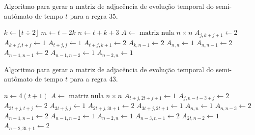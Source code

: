 \documentclass[12pt,a4paper]{article}
\begin{document}
\begin{algorithm}[H]
\caption{Algoritmo para gerar a matriz de adjacência de evolução temporal do
semi-autômato de tempo $t$ para a regra 35.}
\label{alg:r35}
\begin{algorithmic}
\STATE $k \leftarrow \lfloor t \div 2 \rfloor$
\STATE $m \leftarrow t - 2k$
\STATE $n \leftarrow t+k+3$
\STATE $A \leftarrow \mbox{ matriz nula } n \times n$
        \STATE $A_{j,k+j+1} \leftarrow 2$
    \ENDFOR
\ENDIF
{}
    \STATE $A_{k+j,t+j} \leftarrow 1$
\ENDFOR
{}
        \STATE $A_{t+j,j} \leftarrow 1$
    \ENDFOR
\ENDIF
{}
    \STATE $A_{t+j,k+1} \leftarrow 2$
\ENDFOR
{}
    \STATE $A_{k,n-1} \leftarrow 2$
\ENDIF
\STATE $A_{n,n} \leftarrow 1$
\STATE $A_{n,n-1} \leftarrow 2$
\STATE $A_{n-1,n-1} \leftarrow 2$
\STATE $A_{n-1,n-2} \leftarrow 1$
\STATE $A_{n-2,n} \leftarrow 1$
\end{algorithmic}
\end{algorithm}

\begin{algorithm}[H]
\caption{Algoritmo para gerar a matriz de adjacência de evolução temporal do
semi-autômato de tempo $t$ para a regra 43.}
\label{alg:r43}
\begin{algorithmic}
\STATE $n \leftarrow 4(t+1)$
\STATE $A \leftarrow \mbox{ matriz nula } n \times n$
        \STATE $A_{t+j,2t+j+1} \leftarrow 1$
    \ENDFOR
\ENDIF
{}
    \STATE $A_{j,n-t-3+j} \leftarrow 2$
    \STATE $A_{3t+j,t+j} \leftarrow 2$
    \STATE $A_{2t+j,j} \leftarrow 1$
    \STATE $A_{2t+j,3t+1} \leftarrow 2$
\ENDFOR
{}
    \STATE $A_{3t+j,2t+1} \leftarrow 1$
\ENDFOR
\STATE $A_{n,n} \leftarrow 1$
\STATE $A_{n,n-3} \leftarrow 2$
\STATE $A_{n-1,n-1} \leftarrow 2$
\STATE $A_{n-1,n-2} \leftarrow 1$
\STATE $A_{n-2,n} \leftarrow 1$
\STATE $A_{n-3,n-1} \leftarrow 2$
\STATE $A_{2t,n-2} \leftarrow 1$
\STATE $A_{n-2,3t+1} \leftarrow 2$
\end{algorithmic}
\end{algorithm}
\end{document}
